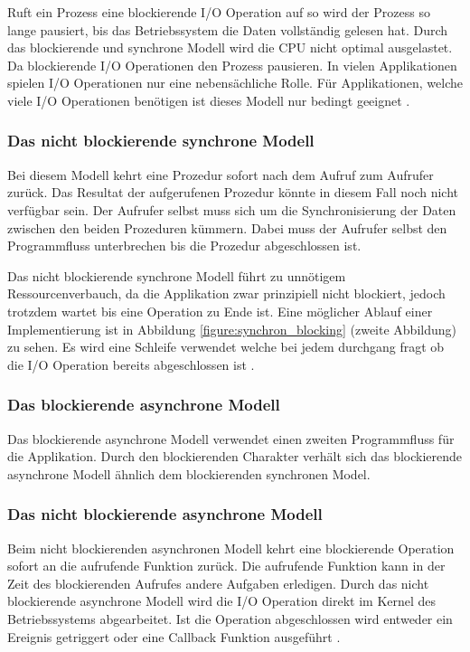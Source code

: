 Ruft ein Prozess eine blockierende I/O Operation auf so wird der Prozess so lange pausiert, bis das Betriebssystem die Daten vollständig gelesen hat. Durch das blockierende und synchrone Modell wird die CPU nicht optimal ausgelastet. Da blockierende I/O Operationen den Prozess pausieren. In vielen Applikationen spielen I/O Operationen nur eine nebensächliche Rolle. Für Applikationen, welche viele I/O Operationen benötigen ist dieses Modell nur bedingt geeignet \cite[p. 48]{Erb2012}.


\subsubsection{Das nicht blockierende synchrone Modell}

Bei diesem Modell kehrt eine Prozedur sofort nach dem Aufruf zum Aufrufer zurück. Das Resultat der aufgerufenen Prozedur könnte in diesem Fall noch nicht verfügbar sein. Der Aufrufer selbst muss sich um die Synchronisierung der Daten zwischen den beiden Prozeduren kümmern. Dabei muss der Aufrufer selbst den Programmfluss unterbrechen bis die Prozedur abgeschlossen ist. 

Das nicht blockierende synchrone Modell führt zu unnötigem Ressourcenverbauch, da die Applikation zwar prinzipiell nicht blockiert, jedoch trotzdem wartet bis eine Operation zu Ende ist. Eine möglicher Ablauf einer Implementierung ist in Abbildung \ref{figure:synchron_blocking} (zweite Abbildung) zu sehen. Es wird eine Schleife verwendet welche bei jedem durchgang fragt ob die I/O Operation bereits abgeschlossen ist \cite[p. 48]{Erb2012}.

\subsubsection{Das blockierende asynchrone Modell}

Das blockierende asynchrone Modell verwendet einen zweiten Programmfluss für die Applikation. Durch den blockierenden Charakter verhält sich das blockierende asynchrone Modell ähnlich dem blockierenden synchronen Model. 

\subsubsection{Das nicht blockierende asynchrone Modell}
Beim nicht blockierenden asynchronen Modell kehrt eine blockierende Operation sofort an die aufrufende Funktion zurück. Die aufrufende Funktion kann in der Zeit des blockierenden Aufrufes andere Aufgaben erledigen. Durch das nicht blockierende asynchrone Modell wird die I/O Operation direkt im Kernel des Betriebssystems abgearbeitet. Ist die Operation abgeschlossen wird entweder ein Ereignis getriggert oder eine Callback Funktion ausgeführt \cite[p. 48]{Erb2012}.

